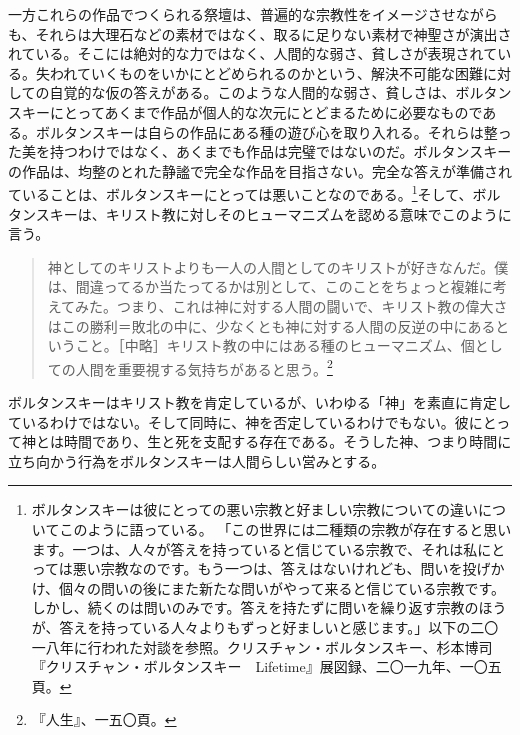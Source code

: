 \documentclass[b5j,twoside,twocolumn]{utarticle}
\begin{document}
一方これらの作品でつくられる祭壇は、普遍的な宗教性をイメージさせながらも、それらは大理石などの素材ではなく、取るに足りない素材で神聖さが演出されている。そこには絶対的な力ではなく、人間的な弱さ、貧しさが表現されている。失われていくものをいかにとどめられるのかという、解決不可能な困難に対しての自覚的な仮の答えがある。このような人間的な弱さ、貧しさは、ボルタンスキーにとってあくまで作品が個人的な次元にとどまるために必要なものである。ボルタンスキーは自らの作品にある種の遊び心を取り入れる。それらは整った美を持つわけではなく、あくまでも作品は完璧ではないのだ。ボルタンスキーの作品は、均整のとれた静謐で完全な作品を目指さない。完全な答えが準備されていることは、ボルタンスキーにとっては悪いことなのである。\footnote{ボルタンスキーは彼にとっての悪い宗教と好ましい宗教についての違いについてこのように語っている。
「この世界には二種類の宗教が存在すると思います。一つは、人々が答えを持っていると信じている宗教で、それは私にとっては悪い宗教なのです。もう一つは、答えはないけれども、問いを投げかけ、個々の問いの後にまた新たな問いがやって来ると信じている宗教です。しかし、続くのは問いのみです。答えを持たずに問いを繰り返す宗教のほうが、答えを持っている人々よりもずっと好ましいと感じます。」以下の二〇一八年に行われた対談を参照。クリスチャン・ボルタンスキー、杉本博司『クリスチャン・ボルタンスキー　Lifetime』展図録、二〇一九年、一〇五頁。}そして、ボルタンスキーは、キリスト教に対しそのヒューマニズムを認める意味でこのように言う。
\begin{quote}
神としてのキリストよりも一人の人間としてのキリストが好きなんだ。僕は、間違ってるか当たってるかは別として、このことをちょっと複雑に考えてみた。つまり、これは神に対する人間の闘いで、キリスト教の偉大さはこの勝利＝敗北の中に、少なくとも神に対する人間の反逆の中にあるということ。［中略］キリスト教の中にはある種のヒューマニズム、個としての人間を重要視する気持ちがあると思う。\footnote{『人生』、一五〇頁。}
\end{quote}


ボルタンスキーはキリスト教を肯定しているが、いわゆる「神」を素直に肯定しているわけではない。そして同時に、神を否定しているわけでもない。彼にとって神とは時間であり、生と死を支配する存在である。そうした神、つまり時間に立ち向かう行為をボルタンスキーは人間らしい営みとする。
\end{document}

